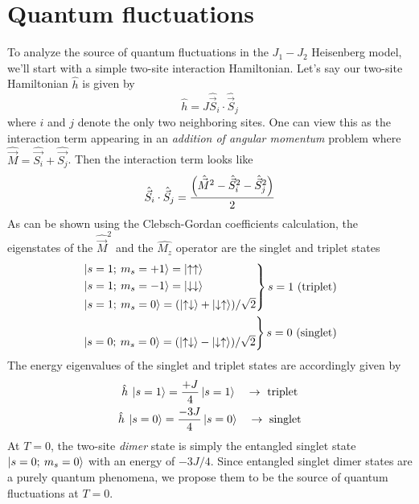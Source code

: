 \documentclass[../thesis_main.tex]{subfiles}
\begin{document}
\section{Quantum fluctuations}
To analyze the source of quantum fluctuations in the $J_1-J_2$ Heisenberg model, we'll start with a simple two-site interaction Hamiltonian. Let's say our two-site Hamiltonian $\hat{h}$ is given by 
\begin{equation}
    \hat{h} = J \hat{\vec{S}}_i \cdot \hat{\vec{S}}_j
\end{equation}
where $i$ and $j$ denote the only two neighboring sites. One can view this as the interaction term appearing in an \textit{addition of angular momentum} problem where $\hat{\vec{M}} = \hat{\vec{S_i}} + \hat{\vec{S_j}}$. Then the interaction term looks like
\begin{equation}
    \hat{\vec{S}}_i \cdot \hat{\vec{S}}_j = \frac{\qty(\hat{\vec{M}}^2 -  \hat{\vec{S}}_i^2 - \hat{\vec{S}}_j^2)}{2}
\end{equation}
As can be shown using the Clebsch-Gordan coefficients calculation, the eigenstates of the $\hat{\vec{M}}^2$ and the $\hat{M_z}$ operator are the singlet and triplet states
\begin{subequations}
    \begin{align}
        \begin{rcases*}
            \ket{s = 1; \: m_s = +1} = \ket{\uparrow \uparrow} \\
            \ket{s = 1; \: m_s = -1} = \ket{\downarrow \downarrow} \\
            \ket{s = 1; \: m_s = 0} = (\ket{\uparrow \downarrow} + \ket{\downarrow \uparrow})/\sqrt{2}
            \end{rcases*} s=1\text{ (triplet)} \\
        \begin{rcases*}
            \\
            \ket{s = 0; \: m_s = 0} = (\ket{\uparrow \downarrow} - \ket{\downarrow \uparrow})/\sqrt{2}
            \\ 
            \end{rcases*} s=0\text{ (singlet)}
    \end{align}    
\end{subequations}
The energy eigenvalues of the singlet and triplet states are accordingly given by
\begin{subequations}
\begin{gather}
    \hat{h} \: \ket{s = 1} = \frac{+J}{4} \ket{s = 1} \quad \rightarrow \text{ triplet} \\
    \hat{h} \: \ket{s = 0} = \frac{-3J}{4} \ket{s = 0} \quad \rightarrow \text{ singlet}
\end{gather}
\end{subequations}
At $T=0$, the two-site \textit{dimer} state is simply the entangled singlet state $\ket{s = 0; \: m_s = 0}$ with an energy of $-3J/4$. Since entangled singlet dimer states are a purely quantum phenomena, we propose them to be the source of quantum fluctuations at $T = 0$.
\end{document}
